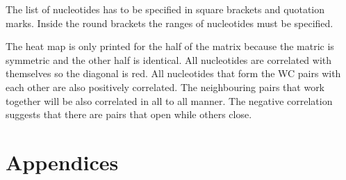 \documentclass[12pt]{article}
\begin{document}
The list of nucleotides has to be specified in square brackets and quotation marks. Inside the round brackets the ranges of nucleotides must be specified. 

The heat map is only printed for the half of the matrix because the matric is symmetric and the other half is identical. All nucleotides are correlated with themselves so the diagonal is red. All nucleotides that form the WC pairs with each other are also positively correlated. The neighbouring pairs that work together will be also correlated in all to all manner. The negative correlation suggests that there are pairs that open while others close.

\section{Appendices}
\end{document}
